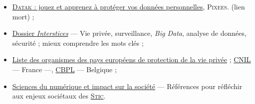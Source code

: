 

\vspace*{-8pt}
%
%
\begin{gofurther}[after skip=0pt, top=4pt, bottom=4pt]%
\vspace{2pt}%
\textsc{}
\smallskip
\begin{itemize}\jazzitem
	\item \href{https://pixees.fr/datak-joue-et-apprend-a-proteger-tes-donnees-personnel\-les/}{\textsc{Datak} : jouez et apprenez à protéger vos données personnelles}, \textsc{Pixees}. (lien mort) ;
	\item \href{https://interstices.info/dossier/donnees-vie-privee/}{Dossier \textit{Interstices}} --- Vie privée, surveillance, \textit{Big Data}, analyse de données, sécurité ; mieux comprendre les mots clés ;
	\item \href{https://www.privacycommission.be/fr/commissions-vie-privee-ue}{Liste des organismes des pays européens de protection de la vie privée} ; \href{https://www.cnil.fr/}{CNIL} --- France ---, \href{https://www.privacycommission.be/}{CBPL} --- Belgique ;
	\item \href{https://interstices.info/sciences-du-numerique-et-impact-sur-la-societe/}{Sciences du numérique et impact sur la société} --- Références pour réfléchir aux enjeux sociétaux des \href{https://fr.wikipedia.org/wiki/Sciences_de_l\%27information_et_de_la_communication}{\textsc{Stic}}.
\end{itemize}
\smallskip
\vspace{2pt}%


\end{gofurther}
